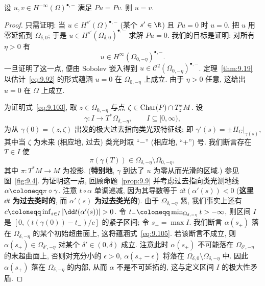 \begin{lemma}[唯一性]\label{lem:9.35}
设 $u, v \in H^{-\infty}(\Omega)^{\bullet,-}$ 满足 $P u = P v$. 则 $u = v$.
\end{lemma}

\begin{proof}
只需证明: 当 $u \in H^{s'}(\Omega)^{\bullet,-}$ (某个 $s' \in \R$) 且 $P u = 0$ 时 $u = 0$. 把 $u$ 用零延拓到 $\Omega_{\delta,0}$; 于是 $u \in H^{s'}(\Omega_{\delta,0})^{\bullet,-}$ 求解 $P u = 0$. 我们的目标是证明: 对所有 $\eta > 0$ 有
\begin{equation}\label{eq:9.103}
    u \in H^\infty(\Omega_{0,-\eta})^{\bullet,-}.
\end{equation}
一旦证明了这一点, 便由 Sobolev 嵌入得到 $u \in \mathcal{C}^2(\Omega_{0,-\eta})^{\bullet,-}$. 定理~\ref{thm:9.19} 以估计~\eqref{eq:9.92} 的形式蕴涵 $u = 0$ 在 $\Omega_{0,-\eta}$ 上成立. 由于 $\eta > 0$ 任意, 这给出 $u = 0$ 在 $\Omega$ 上成立.

为证明式~\eqref{eq:9.103}, 取 $z \in \Omega_{0,-\eta}$ 与点 $\zeta \in \operatorname{Char}(P) \cap T_z^* M$. 设
\begin{equation}\label{eq:9.104}
    \gamma \colon I \to T^* \Omega_{\delta,-\eta}, \qquad I \subseteq [0, \infty),
\end{equation}
为从 $\gamma(0) = (z, \zeta)$ 出发的极大过去指向类光双特征线; 即 $\gamma'(s) = \pm H_G|_{\gamma(s)}$, 其中当 $\zeta$ 为未来 (相应地, 过去) 类光时取 ``$-$'' (相应地, ``$+$'') 号. 我们断言存在 $T \in I$ 使
\begin{equation}\label{eq:9.105}
    \pi(\gamma(T)) \in \Omega_{\delta,-\eta} \setminus \Omega_{0,-\eta},
\end{equation}
其中 $\pi \colon T^* M \to M$ 为投影. (\textbf{特别地}, $\gamma$ 到达了 $u$ 为零从而光滑的区域.) 参见图~\ref{fig:9.4}. 为证明这一点, 回顾命题~\ref{prop:9.9} 并考虑过去指向类光测地线 $\alpha \defeq \pi \circ \gamma$. 注意 $t \circ \alpha$ 单调递减, 因为其导数等于 $\dd t(\alpha'(s)) < 0$ (\textbf{这里} $\dd t$ \textbf{为过去类时的}, 而 $\alpha'(s)$ \textbf{为过去类光的}). 由于 $\Omega_{\delta,-\eta}$ 紧, 我们事实上还有 $c \defeq \inf_{s \in I} |\dd t(\alpha'(s))| > 0$. 令 $t_- \defeq \min_{\Omega_{\delta,-\eta}} t > -\infty$, 则区间 $I$ 是 $[0, (t(\gamma(0)) - t_-)/c]$ 的紧子区间; 令 $s_+ = \max I$. 我们断言 $\alpha(s_+)$ 落在 $\Omega_{\delta,-\eta}$ 的某个初始超曲面上, 这将蕴涵式~\eqref{eq:9.105}. 若该断言不成立, 则 $\alpha(s_+) \in \Omega_{\delta',-\eta}$ 对某个 $\delta' \in (0, \delta)$ 成立. 注意此时 $\alpha(s_+)$ 不可能落在 $\Omega_{\delta',-\eta}$ 的末超曲面上, 否则对充分小的 $\epsilon > 0$, $\alpha(s_+ - \epsilon)$ 将落在 $\Omega_{\delta,0} \setminus \Omega_{\delta,-\eta}$ 中. 因此 $\alpha(s_+)$ 落在 $\Omega_{\delta,-\eta}$ 的内部, 从而 $\alpha$ 不是不可延拓的, 这与定义区间 $I$ 的极大性矛盾.
\end{proof}

